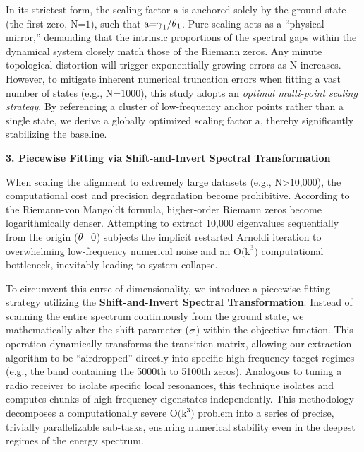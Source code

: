 \documentclass[fleqn,10pt]{wlscirep}
\begin{document}
In its strictest form, the scaling factor \(\text{a}\) is anchored
solely by the ground state (the first zero, \(\text{N}\text{=1}\)), such
that \(\text{a}\text{=}\text{\ensuremath{\gamma}}_{\text{1}}\text{/}\text{\ensuremath{\theta}}_{\text{1}}\).
Pure scaling acts as a ``physical mirror,'' demanding that the intrinsic
proportions of the spectral gaps within the dynamical system closely
match those of the Riemann zeros. Any minute topological distortion will
trigger exponentially growing errors as \(\text{N}\) increases. However,
to mitigate inherent numerical truncation errors when fitting a vast
number of states (e.g., \(\text{N}\text{=1000}\)), this study adopts an
\emph{optimal multi-point scaling strategy}. By referencing a cluster of
low-frequency anchor points rather than a single state, we derive a
globally optimized scaling factor \(\text{a}\), thereby significantly
stabilizing the baseline.

\textbf{3. Piecewise Fitting via Shift-and-Invert Spectral
Transformation}

When scaling the alignment to extremely large datasets (e.g.,
\(\text{N}\text{>10,000}\)), the computational cost and precision
degradation become prohibitive. According to the Riemann-von Mangoldt
formula, higher-order Riemann zeros become logarithmically denser.
Attempting to extract 10,000 eigenvalues sequentially from the origin
(\(\text{\ensuremath{\theta}}\text{=0}\)) subjects the implicit restarted Arnoldi
iteration to overwhelming low-frequency numerical noise and an
\(\text{O}\text{(}\text{k}^{\text{3}}\text{)}\) computational
bottleneck, inevitably leading to system collapse.

To circumvent this curse of dimensionality, we introduce a piecewise
fitting strategy utilizing the \textbf{Shift-and-Invert Spectral
Transformation}. Instead of scanning the entire spectrum continuously
from the ground state, we mathematically alter the shift parameter
(\(\text{\ensuremath{\sigma}}\)) within the objective function. This operation dynamically
transforms the transition matrix, allowing our extraction algorithm to
be ``airdropped'' directly into specific high-frequency target regimes
(e.g., the band containing the 5000th to 5100th zeros). Analogous to
tuning a radio receiver to isolate specific local resonances, this
technique isolates and computes chunks of high-frequency eigenstates
independently. This methodology decomposes a computationally
severe \(\text{O}\text{(}\text{k}^{\text{3}}\text{)}\) problem
into a series of precise, trivially parallelizable sub-tasks,
ensuring numerical stability even in the deepest regimes of the energy
spectrum.
\end{document}
